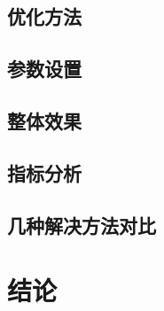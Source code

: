 \documentclass[UTF8]{ctexart}
\begin{document}
\subsection{优化方法}
\subsection{参数设置}
\subsection{整体效果}
\subsection{指标分析}
\subsection{几种解决方法对比}
\section{结论}


\end{document}
